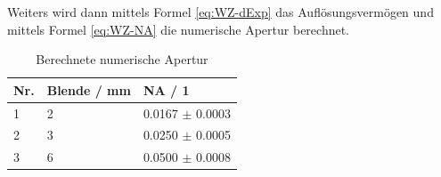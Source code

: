 \documentclass[12pt,a4paper,twoside]{article}
\begin{document}
\begin{table}[H]
    \centering
    \caption{Umrechnen in die räumliche Frequenz für rotes Licht}
    \label{tab:MessungenRäumliche FrequenzRot}
\end{table}

\begin{table}[H]
    \centering
    \caption{Umrechnen in die räumliche Frequenz für blaues Licht}
    \label{tab:MessungenRäumlicheFrequenzBlau}
\end{table}

\noindent
Weiters wird dann mittels Formel \ref{eq:WZ-dExp} das Auflösungsvermögen und mittels Formel \ref{eq:WZ-NA} die numerische Apertur berechnet.

\begin{table}[H]
    \centering
    \caption{Berechnete numerische Apertur}
    \label{tab:BerechneteNA}
    \begin{tabular}{| l | l | l |}
        \hline
        Nr. & Blende / mm & NA / 1\\
        \hline
        1 & 2 & 0.0167 $\pm$ 0.0003 \\
        2 & 3 & 0.0250 $\pm$ 0.0005 \\
        3 & 6 & 0.0500 $\pm$ 0.0008 \\
        \hline
    \end{tabular}
\end{table}
\end{document}
